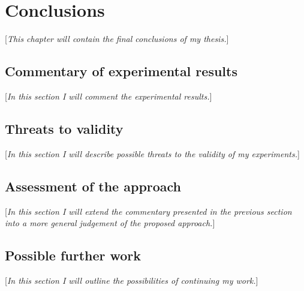 \documentclass{pracamgr}
\begin{document}
\chapter{Conclusions}
\label{cha:conclusions}
[\textit{This chapter will contain the final conclusions of my thesis.}]

\section{Commentary of experimental results}
\label{sec:commentary}
[\textit{In this section I will comment the experimental results.}]

\section{Threats to validity}
\label{sec:threats}
[\textit{In this section I will describe possible threats to the validity of my experiments.}]

\section{Assessment of the approach}
\label{sec:assessment}
[\textit{In this section I will extend the commentary presented in the previous section into a more general judgement of the proposed approach.}]

\section{Possible further work}
\label{sec:further_work}
[\textit{In this section I will outline the possibilities of continuing my work.}]

\printbibliography[heading=bibintoc]
\end{document}
